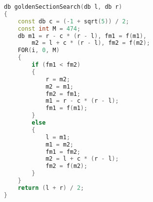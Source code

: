 \begin{lstlisting}[caption={golden-section-search.hpp}, language=C++]
db goldenSectionSearch(db l, db r)
{
	const db c = (-1 + sqrt(5)) / 2;
	const int M = 474;
	db m1 = r - c * (r - l), fm1 = f(m1),
		m2 = l + c * (r - l), fm2 = f(m2);
	FOR(i, 0, M)
	{
		if (fm1 < fm2)
		{
			r = m2;
			m2 = m1;
			fm2 = fm1;
			m1 = r - c * (r - l);
			fm1 = f(m1);
		}
		else
		{
			l = m1;
			m1 = m2;
			fm1 = fm2;
			m2 = l + c * (r - l);
			fm2 = f(m2);
		}
	}
	return (l + r) / 2;
}
\end{lstlisting}
